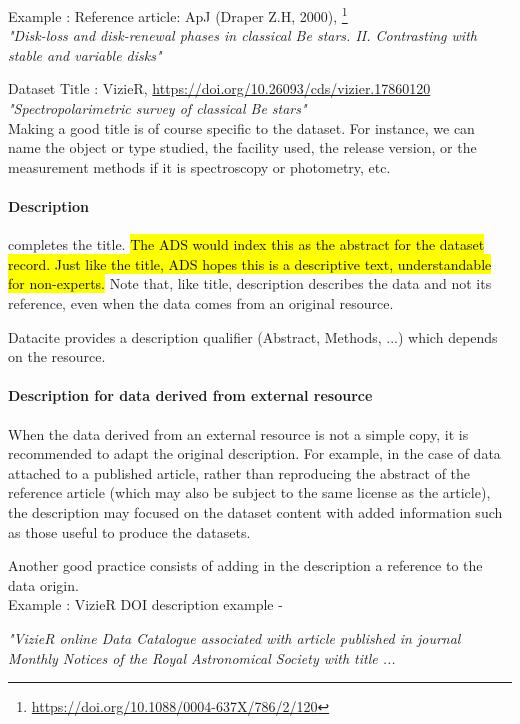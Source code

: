 \documentclass[11pt,a4paper]{ivoa}
\begin{document}
Example : Reference article: ApJ (Draper Z.H, 2000), \footnote{\url{https://doi.org/10.1088/0004-637X/786/2/120}}\\
\textit{"Disk-loss and disk-renewal phases in classical Be stars. II. Contrasting with stable and variable disks"}


Dataset Title : VizieR, \url{https://doi.org/10.26093/cds/vizier.17860120} \\
\textit{"Spectropolarimetric survey of classical Be stars"}\\


Making a good title is of course specific to the dataset. For instance, we can name the object or type studied, the facility used, the release version, or the measurement methods if it is spectroscopy or photometry, etc.


\paragraph{Description} completes the title. 
\hl{The ADS would index this as the abstract for the dataset record. Just like the title, ADS hopes this is a descriptive text, understandable for non-experts.} Note that, like title,
 description describes the data and not its reference, even when the data comes from an original resource.


Datacite provides a description qualifier (Abstract, Methods, ...) which depends on the resource.

\paragraph{Description for data derived from external resource}
When the data derived from an external resource is not a simple copy, it is recommended to adapt the original description. For example, in the case of data attached to a published article, rather than reproducing the abstract of the reference article (which may also be subject to the same license as the article), the description may focused on the dataset content with added information such as those useful to produce the datasets.


Another good practice consists of adding in the description a reference to the data origin.\\


Example : VizieR DOI description example -

\textit{"VizieR online Data Catalogue associated with article published in journal Monthly Notices of the Royal Astronomical Society with title ... }
\end{document}
